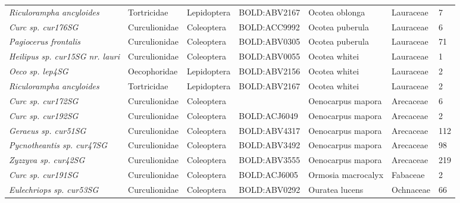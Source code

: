 \documentclass[11pt]{article}
\begin{document}
\begin{landscape}
\begin{longtable}{@{}lllllll@{}}
\textit{Riculorampha ancyloides}                      & Tortricidae     & Lepidoptera  & BOLD:ABV2167 & Ocotea oblonga                     & Lauraceae        & 7     \\
\textit{Curc sp. cur176SG}                            & Curculionidae   & Coleoptera   & BOLD:ACC9992 & Ocotea puberula                    & Lauraceae        & 6     \\
\textit{Pagiocerus frontalis}                         & Curculionidae   & Coleoptera   & BOLD:ABV0305 & Ocotea puberula                    & Lauraceae        & 71    \\
\textit{Heilipus sp. cur15SG nr. lauri}               & Curculionidae   & Coleoptera   & BOLD:ABV0055 & Ocotea whitei                      & Lauraceae        & 1     \\
\textit{Oeco sp. lep4SG}                              & Oecophoridae    & Lepidoptera  & BOLD:ABV2156 & Ocotea whitei                      & Lauraceae        & 2     \\
\textit{Riculorampha ancyloides}                      & Tortricidae     & Lepidoptera  & BOLD:ABV2167 & Ocotea whitei                      & Lauraceae        & 2     \\
\textit{Curc sp. cur172SG}                            & Curculionidae   & Coleoptera   &              & Oenocarpus mapora                  & Arecaceae        & 6     \\
\textit{Curc sp. cur192SG}                            & Curculionidae   & Coleoptera   & BOLD:ACJ6049 & Oenocarpus mapora                  & Arecaceae        & 2     \\
\textit{Geraeus sp. cur51SG}                          & Curculionidae   & Coleoptera   & BOLD:ABV4317 & Oenocarpus mapora                  & Arecaceae        & 112   \\
\textit{Pycnotheantis sp. cur47SG}                    & Curculionidae   & Coleoptera   & BOLD:ABV3492 & Oenocarpus mapora                  & Arecaceae        & 98    \\
\textit{Zyzzyva sp. cur42SG}                          & Curculionidae   & Coleoptera   & BOLD:ABV3555 & Oenocarpus mapora                  & Arecaceae        & 219   \\
\textit{Curc sp. cur191SG}                            & Curculionidae   & Coleoptera   & BOLD:ACJ6005 & Ormosia macrocalyx                 & Fabaceae         & 2     \\
\textit{Eulechriops sp. cur53SG}                      & Curculionidae   & Coleoptera   & BOLD:ABV0292 & Ouratea lucens                     & Ochnaceae        & 66    \\

\end{longtable}
\end{landscape}
\end{document}
